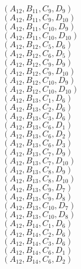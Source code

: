 \documentclass[14pt]{article}
\begin{document}
    $({A}_{12}, {B}_{11}, {C}_{9}, {D}_{9}) $ \\ 
    $({A}_{12}, {B}_{11}, {C}_{9}, {D}_{10}) $ \\ 
    $({A}_{12}, {B}_{11}, {C}_{10}, {D}_{9}) $ \\ 
    $({A}_{12}, {B}_{11}, {C}_{10}, {D}_{10}) $ \\ 
    $({A}_{12}, {B}_{12}, {C}_{5}, {D}_{6}) $ \\ 
    $({A}_{12}, {B}_{12}, {C}_{6}, {D}_{5}) $ \\ 
    $({A}_{12}, {B}_{12}, {C}_{9}, {D}_{9}) $ \\ 
    $({A}_{12}, {B}_{12}, {C}_{9}, {D}_{10}) $ \\ 
    $({A}_{12}, {B}_{12}, {C}_{10}, {D}_{9}) $ \\ 
    $({A}_{12}, {B}_{12}, {C}_{10}, {D}_{10}) $ \\ 
    $({A}_{12}, {B}_{13}, {C}_{1}, {D}_{6}) $ \\ 
    $({A}_{12}, {B}_{13}, {C}_{2}, {D}_{6}) $ \\ 
    $({A}_{12}, {B}_{13}, {C}_{3}, {D}_{6}) $ \\ 
    $({A}_{12}, {B}_{13}, {C}_{6}, {D}_{1}) $ \\ 
    $({A}_{12}, {B}_{13}, {C}_{6}, {D}_{2}) $ \\ 
    $({A}_{12}, {B}_{13}, {C}_{6}, {D}_{3}) $ \\ 
    $({A}_{12}, {B}_{13}, {C}_{7}, {D}_{9}) $ \\ 
    $({A}_{12}, {B}_{13}, {C}_{7}, {D}_{10}) $ \\ 
    $({A}_{12}, {B}_{13}, {C}_{8}, {D}_{9}) $ \\ 
    $({A}_{12}, {B}_{13}, {C}_{8}, {D}_{10}) $ \\ 
    $({A}_{12}, {B}_{13}, {C}_{9}, {D}_{7}) $ \\ 
    $({A}_{12}, {B}_{13}, {C}_{9}, {D}_{8}) $ \\ 
    $({A}_{12}, {B}_{13}, {C}_{10}, {D}_{7}) $ \\ 
    $({A}_{12}, {B}_{13}, {C}_{10}, {D}_{8}) $ \\ 
    $({A}_{12}, {B}_{14}, {C}_{1}, {D}_{6}) $ \\ 
    $({A}_{12}, {B}_{14}, {C}_{2}, {D}_{6}) $ \\ 
    $({A}_{12}, {B}_{14}, {C}_{3}, {D}_{6}) $ \\ 
    $({A}_{12}, {B}_{14}, {C}_{6}, {D}_{1}) $ \\ 
    $({A}_{12}, {B}_{14}, {C}_{6}, {D}_{2}) $ \\ 
\end{document}
